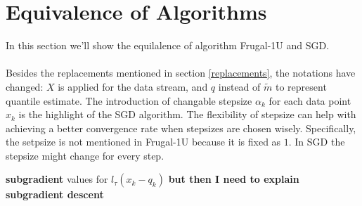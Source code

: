 \section{Equivalence of Algorithms}
In this section we'll show the equilalence of algorithm Frugal-1U 
and SGD.
\\\\
Besides the replacements mentioned in section \ref{replacements},
the notations have changed: 
$X$ is applied for the data stream, and $q$ instead of $\tilde{m}$
to represent quantile estimate.
The introduction of changable stepsize $\alpha_k$ for each data point $x_k$
is the highlight of the SGD algorithm. The flexibility of stepsize can help
with achieving a better convergence rate when stepsizes are chosen wisely.
Specifically, the setpsize is not mentioned in Frugal-1U 
because it is fixed as $1$. In SGD the stepsize might change for every step.


\textbf{subgradient} values for $l_\tau(x_k - q_k)$ 
{\color{red} \textbf{but then I need to explain subgradient descent}} 

